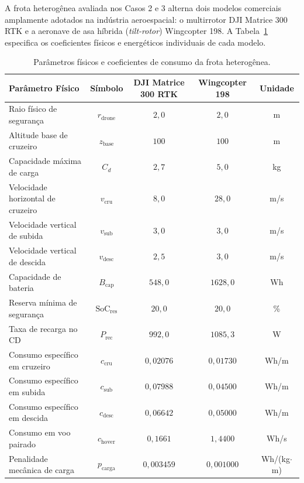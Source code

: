 A frota heterogênea avaliada nos Casos 2 e 3 alterna dois modelos comerciais amplamente adotados na indústria aeroespacial: o multirrotor DJI Matrice 300 RTK e a aeronave de asa híbrida (\textit{tilt-rotor}) Wingcopter 198. A Tabela~\ref{tab:perfis_drones} especifica os coeficientes físicos e energéticos individuais de cada modelo.

\begin{table}[htbp]
\centering
\small
\caption{Parâmetros físicos e coeficientes de consumo da frota heterogênea.}\label{tab:perfis_drones}
\begin{tabular}{l c c c c}
\toprule
\textbf{Parâmetro Físico} & \textbf{Símbolo} & \textbf{DJI Matrice 300 RTK} & \textbf{Wingcopter 198} & \textbf{Unidade} \\
\midrule
Raio físico de segurança & $r_{\text{drone}}$ & $2{,}0$ & $2{,}0$ & m \\
Altitude base de cruzeiro & $z_{\text{base}}$ & $100$ & $100$ & m \\
Capacidade máxima de carga & $C_d$ & $2{,}7$ & $5{,}0$ & kg \\
Velocidade horizontal de cruzeiro & $v_{\text{cru}}$ & $8{,}0$ & $28{,}0$ & m/s \\
Velocidade vertical de subida & $v_{\text{sub}}$ & $3{,}0$ & $3{,}0$ & m/s \\
Velocidade vertical de descida & $v_{\text{desc}}$ & $2{,}5$ & $3{,}0$ & m/s \\
Capacidade de bateria & $B_{\text{cap}}$ & $548{,}0$ & $1628{,}0$ & Wh \\
Reserva mínima de segurança & $\text{SoC}_{\text{res}}$ & $20{,}0$ & $20{,}0$ & \% \\
Taxa de recarga no CD & $P_{\text{rec}}$ & $992{,}0$ & $1085{,}3$ & W \\
Consumo específico em cruzeiro & $c_{\text{cru}}$ & $0{,}02076$ & $0{,}01730$ & Wh/m \\
Consumo específico em subida & $c_{\text{sub}}$ & $0{,}07988$ & $0{,}04500$ & Wh/m \\
Consumo específico em descida & $c_{\text{desc}}$ & $0{,}06642$ & $0{,}05000$ & Wh/m \\
Consumo em voo pairado & $c_{\text{hover}}$ & $0{,}1661$ & $1{,}4400$ & Wh/s \\
Penalidade mecânica de carga & $p_{\text{carga}}$ & $0{,}003459$ & $0{,}001000$ & Wh/(kg$\cdot$m) \\
\bottomrule
\end{tabular}
\end{table}

